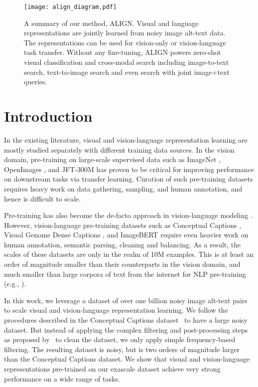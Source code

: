 \documentclass{article}
\begin{document}
\begin{figure*}[t]
    \centering
    \texttt{[image: align\_diagram.pdf]}
    \vskip -0.1in
    \caption{A summary of our method, ALIGN. Visual and language representations are jointly learned from noisy image alt-text data. The representations can be used for vision-only or vision-language task transfer. Without any fine-tuning, ALIGN powers zero-shot visual classification and cross-modal search including image-to-text search, text-to-image search and even search with joint image+text queries.}
    \label{fig:diagram}
    \vskip -0.1in
\end{figure*}

\section{Introduction}
In the existing literature, visual and vision-language representation learning are mostly studied separately with different training data sources. In the vision domain, pre-training
on large-scale supervised data such as ImageNet \cite{deng:imagenet}, OpenImages \cite{kuznetsova:openimages}, and JFT-300M \cite{sun:jft, kolensnikov:bit} has proven to be critical for improving performance on downstream tasks via transfer learning. Curation of such pre-training datasets 
requires heavy work on data gathering, sampling, and human annotation, and hence is difficult to scale.

Pre-training has also become the de-facto approach in vision-language modeling \cite{lu:vilbert, chen:uniter, li:oscar}. However, vision-language pre-training datasets such as Conceptual Captions \cite{sharma:cc3m}, Visual Genome Dense Captions \cite{krishna:visualgenome}, 
and ImageBERT
\cite{qi:imagebert} require even heavier work on human annotation, semantic parsing, cleaning and balancing. As a result, the scales of these datasets are only in the realm of 10M examples. This is at least an order of magnitude smaller than their counterparts in the vision domain, and much smaller than large corpora of text from the internet for 
NLP
pre-training (e.g., \citet{devlin:bert, radford:gpt2, yang:xlnet, liu:roberta, raffel:t5}).

In this work, we leverage a dataset of over one billion noisy image alt-text pairs to scale visual and vision-language representation learning. 
We follow the procedures described in the Conceptual Captions dataset~\cite{sharma:cc3m} to have a large noisy dataset. But instead of applying the complex filtering and post-processing steps as proposed by~\cite{sharma:cc3m} to clean the dataset, we only apply simple frequency-based filtering. 
The resulting dataset is noisy, but is two orders of magnitude larger than the Conceptual Captions dataset. We show that visual and vision-language representations pre-trained on our exascale dataset achieve very strong performance on a wide range of tasks. 
\end{document}
